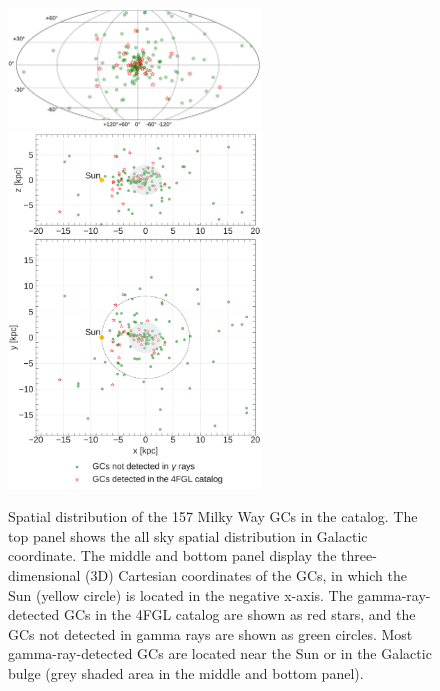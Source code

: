 \documentclass[doublespace,nopageskip]{VTthesis} %
\begin{document}
\begin{figure}
    \centering
    \includegraphics[width=0.6\textwidth]{Figures/Globular/AllSky_map.pdf}
    \includegraphics[width=0.6\textwidth]{Figures/Globular/distance_map.pdf}
    \caption{Spatial distribution of the 157 Milky Way GCs in the \citet{1996AJ....112.1487H} catalog. The top panel shows  the all sky spatial distribution in Galactic coordinate. The middle and bottom panel display the three-dimensional (3D) Cartesian %
    coordinates of the GCs, in which %
    the Sun (yellow circle) is located in the negative x-axis. The gamma-ray-detected GCs in the 4FGL catalog are shown as red stars, %
    and the GCs not detected in gamma rays are shown as green circles. Most gamma-ray-detected GCs are located near the Sun or in the Galactic bulge (grey shaded area in the middle and bottom panel).}
    \label{fig:all_sky_distribution}
\end{figure}
\end{document}
